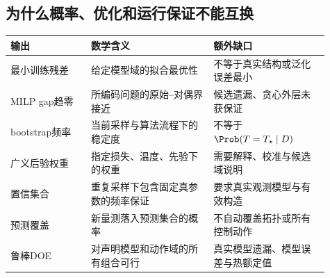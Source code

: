 \subsection{为什么概率、优化和运行保证不能互换}
\begin{longtable}{p{0.23\linewidth}p{0.35\linewidth}p{0.33\linewidth}}
\toprule 输出 & 数学含义 & 额外缺口\\\midrule\endhead
最小训练残差 & 给定模型域的拟合最优性 & 不等于真实结构或泛化误差最小\\
MILP gap趋零 & 所编码问题的原始--对偶界接近 & 候选遗漏、贪心外层未获保证\\
bootstrap频率 & 当前采样与算法流程下的稳定度 & 不等于 $\Prob(T=T_\star\mid D)$\\
广义后验权重 & 指定损失、温度、先验下的权重 & 需要解释、校准与候选域说明\\
置信集合 & 重复采样下包含固定真参数的频率保证 & 要求真实观测模型与有效构造\\
预测覆盖 & 新量测落入预测集合的概率 & 不自动覆盖拓扑或所有控制动作\\
鲁棒DOE & 对声明模型和动作域的所有组合可行 & 真实模型遗漏、模型误差与热额定值\\
\bottomrule
\end{longtable}

